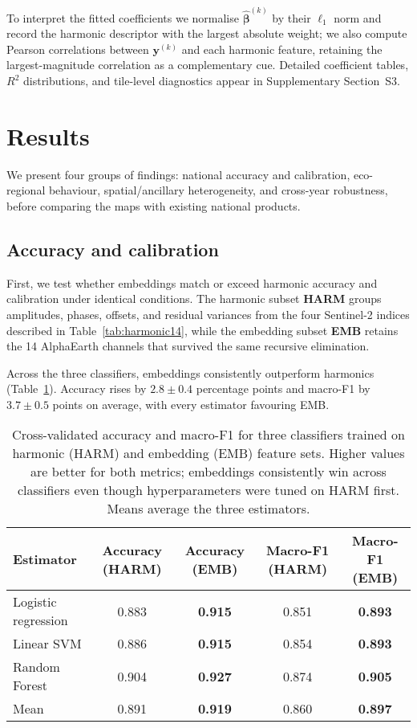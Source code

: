 \documentclass[utf8]{FrontiersinHarvard}
\begin{document}
To interpret the fitted coefficients we normalise \(\hat{\boldsymbol{\beta}}^{(k)}\) by their $\ell_1$ norm and record the harmonic descriptor with the largest absolute weight; we also compute Pearson correlations between \(\mathbf{y}^{(k)}\) and each harmonic feature, retaining the largest-magnitude correlation as a complementary cue. Detailed coefficient tables, $R^2$ distributions, and tile-level diagnostics appear in Supplementary Section~S3.

\section{Results}
\label{sec:results}
We present four groups of findings: national accuracy and calibration, eco-regional behaviour, spatial/ancillary heterogeneity, and cross-year robustness, before comparing the maps with existing national products.
\subsection{Accuracy and calibration}
First, we test whether embeddings match or exceed harmonic accuracy and calibration under identical conditions. The harmonic subset \textbf{HARM} groups amplitudes, phases, offsets, and residual variances from the four Sentinel-2 indices described in Table~\ref{tab:harmonic14}, while the embedding subset \textbf{EMB} retains the 14 AlphaEarth channels that survived the same recursive elimination.

Across the three classifiers, embeddings consistently outperform harmonics (Table~\ref{tab:multi_model_cv}). Accuracy rises by \(2.8 \pm 0.4\) percentage points and macro-F1 by \(3.7 \pm 0.5\) points on average, with every estimator favouring EMB.
\begin{table}[H]
    \centering
    \small
    \begin{tabular}{lcccc}
        \toprule
        \textbf{Estimator} & \textbf{Accuracy (HARM)} & \textbf{Accuracy (EMB)} & \textbf{Macro-F1 (HARM)} & \textbf{Macro-F1 (EMB)} \\
        \midrule
        Logistic regression & 0.883 & \textbf{0.915} & 0.851 & \textbf{0.893} \\
        Linear SVM & 0.886 & \textbf{0.915} & 0.854 & \textbf{0.893} \\
        Random Forest & 0.904 & \textbf{0.927} & 0.874 & \textbf{0.905} \\
        \midrule
        Mean & 0.891 & \textbf{0.919} & 0.860 & \textbf{0.897} \\
        \bottomrule
    \end{tabular}
    \caption{Cross-validated accuracy and macro-F1 for three classifiers trained on harmonic (HARM) and embedding (EMB) feature sets. Higher values are better for both metrics; embeddings consistently win across classifiers even though hyperparameters were tuned on HARM first. Means average the three estimators.}
    \label{tab:multi_model_cv}
\end{table}
\end{document}
